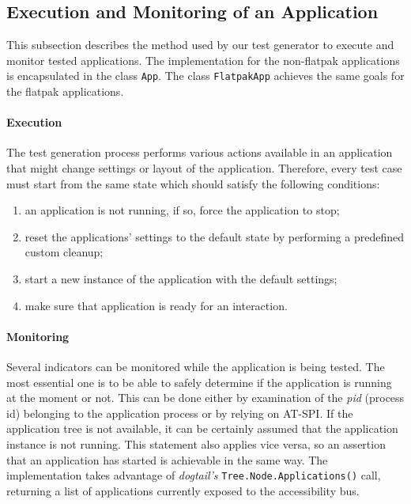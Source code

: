 \subsection{Execution and Monitoring of an Application}\label{monitoring}

This subsection describes the method used by our test generator to execute and monitor tested applications. The implementation for the non-flatpak applications is encapsulated in the class \texttt{App}. The class \texttt{FlatpakApp} achieves the same goals for the flatpak applications.

\paragraph{Execution} The test generation process performs various actions available in an application that might change settings or layout of the application. Therefore, every test case must start from the same state which should satisfy the following conditions: 
\begin{enumerate}
    \item an application is not running, if so, force the application to stop;
    \item reset the applications' settings to the default state by performing a predefined custom cleanup;
    \item start a new instance of the application with the default settings;
    \item make sure that application is ready for an interaction.
\end{enumerate}

\paragraph{Monitoring} Several indicators can be monitored while the application is being tested. The most essential one is to be able to safely determine if the application is running at the moment or not. This can be done either by examination of the \textit{pid} (process id) belonging to the application process or by relying on AT-SPI. If the application tree is not available, it can be certainly assumed that the application instance is not running. This statement also applies vice versa, so an assertion that an application has started is achievable in the same way. The implementation takes advantage of \textit{dogtail's} \texttt{Tree.Node.Applications()} call, returning a list of applications currently exposed to the accessibility bus.


